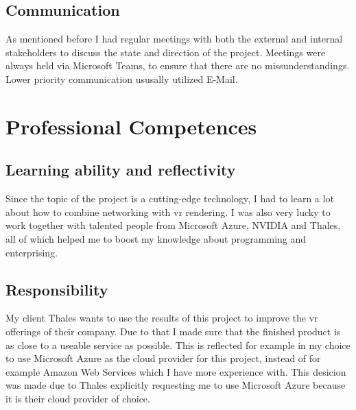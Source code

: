 \documentclass[]{article}
\begin{document}
\subsection{Communication}
As mentioned before I had regular meetings with both the external and internal stakeholders to discuss the state and direction of the project. Meetings were always held via Microsoft Teams, to ensure that there are no missunderstandings. Lower priority communication ususally utilized E-Mail.

\section{Professional Competences}
\subsection{Learning ability and reflectivity}
Since the topic of the project is a cutting-edge technology, I had to learn a lot about how to combine networking with \acrshort{vr} rendering. I was also very lucky to work together with talented people from Microsoft Azure, NVIDIA and Thales, all of which helped me to boost my knowledge about programming and enterprising. 

\subsection{Responsibility}
My client Thales wants to use the results of this project to improve the \acrshort{vr} offerings of their company. Due to that I made sure that the finished product is as close to a useable service as possible. This is reflected for example in my choice to use Microsoft Azure as the cloud provider for this project, instead of for example Amazon Web Services which I have more experience with. This desicion was made due to Thales explicitly requesting me to use Microsoft Azure because it is their cloud provider of choice.

\printbibliography
\end{document}
